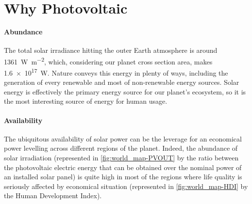 
\section{Why Photovoltaic}

	\paragraph{Abundance}
	The total solar irradiance hitting the outer Earth atmosphere is around \SI{1361}{\watt\per\square\metre},\cite{Kopp2011} which, considering our planet cross section area, makes \SI{1.6e17}{\watt}.
	Nature conveys this energy in plenty of ways, including the generation of every renewable and most of non-renewable energy sources.
	Solar energy is effectively the primary energy source for our planet's ecosystem, so it is the most interesting source of energy for human usage.



	\paragraph{Availability}
	The ubiquitous availability of solar power can be the leverage for an economical power levelling across different regions of the planet.
	Indeed, the abundance of solar irradiation (represented in \cref{fig:world_map-PVOUT} by the ratio between the photovoltaic electric energy that can be obtained over the nominal power of an installed solar panel) is quite high in most of the regions where life quality is seriously affected by economical situation (represented in \cref{fig:world_map-HDI} by the Human Development Index).

